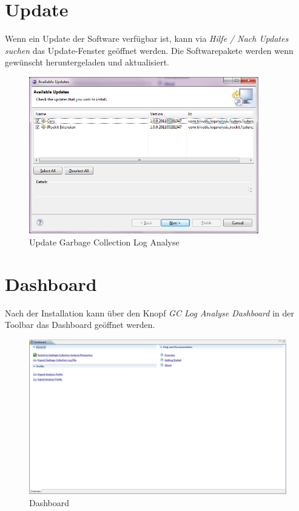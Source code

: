 \section*{Update}
Wenn ein Update der Software verfügbar ist, kann via \textit{Hilfe / Nach Updates suchen} das Update-Fenster geöffnet werden. Die  Softwarepakete werden wenn gewünscht heruntergeladen und aktualisiert.
 \begin{figure}[H]
  	\centering
    	\includegraphics[width=10cm]{images/tutorial_update01}
        	\caption{Update Garbage Collection Log Analyse}
\end{figure}

\section*{Dashboard}
Nach der Installation kann über den Knopf \textit{GC Log Analyse Dashboard} in der Toolbar das Dashboard geöffnet werden. 
 \begin{figure}[H]
  	\centering
    	\includegraphics[width=16cm]{images/tutorial_dashboard}
        	\caption{Dashboard}
\end{figure}

